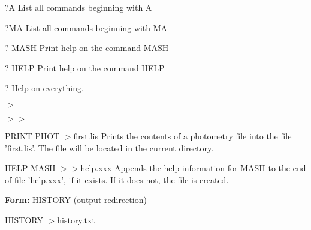 {\newpage\clearpage
{}%
\begin{example}
  \item[?A\hfill]{List all commands beginning with A}
  \item[?MA\hfill]{List all commands beginning with MA}
\end{example}%
\lthtmlfigureZ
\lthtmlcheckvsize\clearpage}

{\newpage\clearpage
{}%
\begin{example}
  \item[? MASH\hfill]{Print help on the command MASH}
  \item[? HELP\hfill]{Print help on the command HELP}
  \item[?\hfill]{Help on everything.}
\end{example}%
\lthtmlfigureZ
\lthtmlcheckvsize\clearpage}

{\newpage\clearpage
{}%
$>$%
\lthtmlinlinemathZ
\lthtmlcheckvsize\clearpage}

{\newpage\clearpage
{}%
$>>$%
\lthtmlinlinemathZ
\lthtmlcheckvsize\clearpage}

{\newpage\clearpage
{}%
\begin{example}
  \item[PRINT PHOT $>$first.lis\hfill]{Prints the contents of a 
       photometry file into the file 'first.lis'.  The file will be
       located in the current directory.}
\par
\item[HELP MASH $>>$help.xxx\hfill]{Appends the help information for
        MASH to the end of file 'help.xxx', if it exists.  If it does not,
        the file is created.}
\end{example}%
\lthtmlfigureZ
\lthtmlcheckvsize\clearpage}

{\newpage\clearpage
{}%
\begin{command}
  \item[\textbf{Form: }HISTORY (output redirection)]{}
\end{command}%
\lthtmlfigureZ
\lthtmlcheckvsize\clearpage}

{\newpage\clearpage
{}%
\begin{hanging}
  \item{HISTORY $>$history.txt}
\end{hanging}%
\lthtmlfigureZ
\lthtmlcheckvsize\clearpage}

